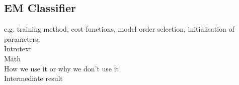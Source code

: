 \subsection{EM Classifier}

e.g. training method, cost functions, model order selection, initialisation of parameters.\\

Introtext\\

Math\\

How we use it or why we don't use it\\

Intermediate result\\

